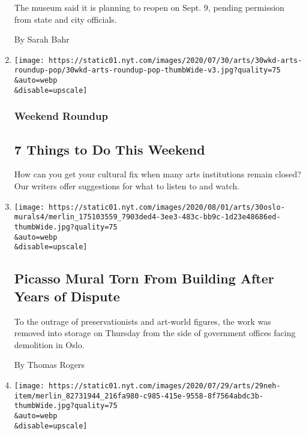 \begin{enumerate}
  The museum said it is planning to reopen on Sept. 9, pending
  permission from state and city officials.

  By Sarah Bahr
\item
  \href{/2020/07/30/arts/things-to-do-weekend-coronavirus.html}{}

  \texttt{[image: https://static01.nyt.com/images/2020/07/30/arts/30wkd-arts-roundup-pop/30wkd-arts-roundup-pop-thumbWide-v3.jpg?quality=75\\\&auto=webp\\\&disable=upscale]}

  \hypertarget{weekend-roundup}{%
  \subsubsection{Weekend Roundup}\label{weekend-roundup}}

  \hypertarget{7-things-to-do-this-weekend}{%
  \subsection{7 Things to Do This
  Weekend}\label{7-things-to-do-this-weekend}}

  How can you get your cultural fix when many arts institutions remain
  closed? Our writers offer suggestions for what to listen to and watch.
\item
  \href{/2020/07/30/arts/design/picasso-fishermen-mural-norway.html}{}

  \texttt{[image: https://static01.nyt.com/images/2020/08/01/arts/30oslo-murals4/merlin\_175103559\_7903ded4-3ee3-483c-bb9c-1d23e48686ed-thumbWide.jpg?quality=75\\\&auto=webp\\\&disable=upscale]}

  \hypertarget{picasso-mural-torn-from-building-after-years-of-dispute}{%
  \subsection{Picasso Mural Torn From Building After Years of
  Dispute}\label{picasso-mural-torn-from-building-after-years-of-dispute}}

  To the outrage of preservationists and art-world figures, the work was
  removed into storage on Thursday from the side of government offices
  facing demolition in Oslo.

  By Thomas Rogers
\item
  \href{/2020/07/29/arts/national-endowment-for-the-humanities-grants.html}{}

  \texttt{[image: https://static01.nyt.com/images/2020/07/29/arts/29neh-item/merlin\_82731944\_216fa980-c985-415e-9558-8f7564abdc3b-thumbWide.jpg?quality=75\\\&auto=webp\\\&disable=upscale]}


\end{enumerate}
